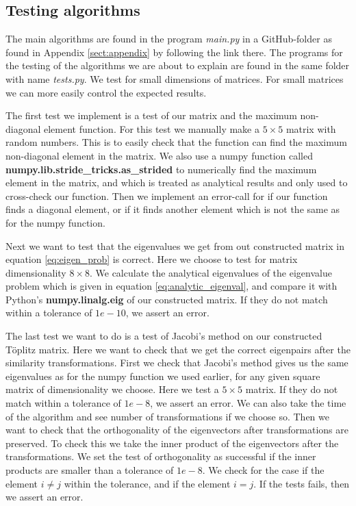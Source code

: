 \documentclass[12pt,a4paper,english]{article}
\begin{document}
\subsection{Testing algorithms}
\label{sect:testing}
The main algorithms are found in the program \textit{main.py} in a GitHub-folder as found in Appendix \ref{sect:appendix} by following the link there. The programs for the testing of the algorithms we are about to explain are found in the same folder with name \textit{tests.py}. We test for small dimensions of matrices. For small matrices we can more easily control the expected results.

The first test we implement is a test of our matrix and the maximum non-diagonal element function. For this test we manually make a $5\times5$ matrix with random numbers. This is to easily check that the function can find the maximum non-diagonal element in the matrix. We also use a numpy function called \textbf{numpy.lib.stride\_tricks.as\_strided} to numerically find the maximum element in the matrix, and which is treated as analytical results and only used to cross-check our function. Then we implement an error-call for if our function finds a diagonal element, or if it finds another element which is not the same as for the numpy function.

Next we want to test that the eigenvalues we get from out constructed matrix in equation \ref{eq:eigen_prob} is correct. Here we choose to test for matrix dimensionality $8\times8$. We calculate the analytical eigenvalues of the eigenvalue problem which is given in equation \ref{eq:analytic_eigenval}, and compare it with Python's \textbf{numpy.linalg.eig} of our constructed matrix. If they do not match within a tolerance of $1e-10$, we assert an error.

The last test we want to do is a test of Jacobi's method on our constructed Töplitz matrix. Here we want to check that we get the correct eigenpairs after the similarity transformations. First we check that Jacobi's method gives us the same eigenvalues as for the numpy function we used earlier, for any given square matrix of dimensionality we choose. Here we test a $5\times5$ matrix. If they do not match within a tolerance of $1e-8$, we assert an error. We can also take the time of the algorithm and see number of transformations if we choose so. Then we want to check that the orthogonality of the eigenvectors after transformations are preserved. To check this we take the inner product of the eigenvectors after the transformations. We set the test of orthogonality as successful if the inner products are smaller than a tolerance of $1e-8$. We check for the case if the element $i\neq j$ within the tolerance, and if the element $i=j$. If the tests fails, then we assert an error.
\end{document}
